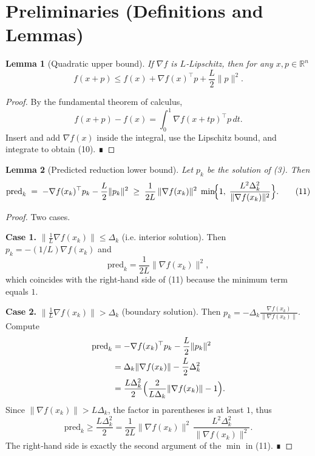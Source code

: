 \documentclass{article}
\newtheorem{lemma}{Lemma}[section]
\begin{document}
\section*{Preliminaries (Definitions and Lemmas)}
\begin{lemma}[Quadratic upper bound]\label{lem:upper}
If $\nabla f$ is $L$‑Lipschitz, then for any $x,p\in\mathbb{R}^{n}$
\[
f(x+p)\le f(x)+\nabla f(x)^{\top}p+\frac{L}{2}\|p\|^{2}.
\tag{10}
\]
\end{lemma}
\begin{proof}
By the fundamental theorem of calculus,
\[
f(x+p)-f(x)=\int_{0}^{1}\nabla f(x+tp)^{\top}p\,dt.
\]
Insert and add $\nabla f(x)$ inside the integral, use the Lipschitz bound,
and integrate to obtain (10).  ∎
\end{proof}

\begin{lemma}[Predicted reduction lower bound]\label{lem:pred}
Let $p_{k}$ be the solution of (3). Then
\[
\text{pred}_{k}
\;=\;-\nabla f(x_{k})^{\top}p_{k}-\frac{L}{2}\|p_{k}\|^{2}
\;\ge\;
\frac{1}{2L}\,\|\nabla f(x_{k})\|^{2}\;\min\!\Bigl\{1,\;
\frac{L^{2}\Delta_{k}^{2}}{\|\nabla f(x_{k})\|^{2}}\Bigr\}.
\tag{11}
\]
\end{lemma}
\begin{proof}
Two cases.

\textbf{Case 1.} $\| \frac{1}{L}\nabla f(x_{k})\|\le\Delta_{k}$
(i.e. interior solution).  Then $p_{k}=-(1/L)\nabla f(x_{k})$ and
\[
\text{pred}_{k}= \frac{1}{2L}\|\nabla f(x_{k})\|^{2},
\]
which coincides with the right‑hand side of (11) because the minimum term equals $1$.

\textbf{Case 2.} $\| \frac{1}{L}\nabla f(x_{k})\|>\Delta_{k}$
(boundary solution).  Then $p_{k}= -\Delta_{k}\frac{\nabla f(x_{k})}{\|\nabla f(x_{k})\|}$.
Compute
\[
\begin{aligned}
\text{pred}_{k}
&= -\nabla f(x_{k})^{\top}p_{k}-\frac{L}{2}\|p_{k}\|^{2}\\
&= \Delta_{k}\|\nabla f(x_{k})\|
    -\frac{L}{2}\Delta_{k}^{2}\\
&= \frac{L\Delta_{k}^{2}}{2}
   \Bigl(\frac{2}{L\Delta_{k}}\|\nabla f(x_{k})\|-1\Bigr) .
\end{aligned}
\]
Since $\|\nabla f(x_{k})\|>L\Delta_{k}$, the factor in parentheses is at least
$1$, thus
\[
\text{pred}_{k}\ge\frac{L\Delta_{k}^{2}}{2}
= \frac{1}{2L}\|\nabla f(x_{k})\|^{2}\,
  \frac{L^{2}\Delta_{k}^{2}}{\|\nabla f(x_{k})\|^{2}} .
\]
The right‑hand side is exactly the second argument of the $\min$ in (11).
∎
\end{proof}
\end{document}
